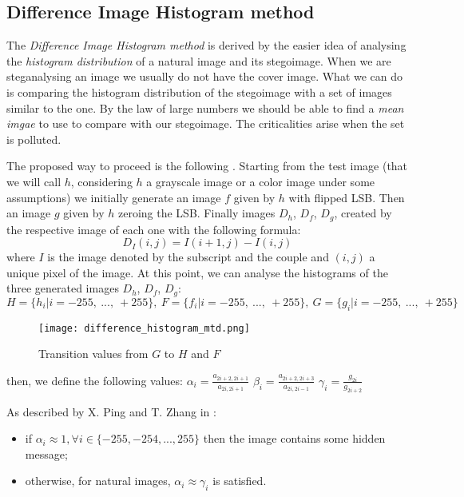 \documentclass[../../main.tex]{subfiles}
\begin{document}
\subsection{Difference Image Histogram method}
The \emph{Difference Image Histogram method} is derived by the easier idea
of analysing the \emph{histogram distribution} of a natural image and its
stegoimage. When we are steganalysing an image we usually do not
have the cover image. What we can do is comparing the histogram
distribution of the stegoimage with a set of images similar to the one. 
By the law of large numbers we should be able to find a \emph{mean imgae} to use to compare with our stegoimage.
The criticalities arise when the set is polluted.
\cite{methodology-steganalysis-images}

The proposed way to proceed is the following
\cite{new-detection-lsb-steganography}. 
Starting from the test image (that we will call $h$, considering $h$ a grayscale image or a color image under
some assumptions) we initially generate an image $f$ given by $h$ with flipped LSB. 
Then an image $g$ given by $h$ zeroing the LSB. Finally images $D_h$, $D_f$, $D_g$, 
created by the respective image of each one with the following formula:
          \[ D_{I}(i,j) = I(i+1,j) - I(i,j) \]
where $I$ is the image denoted by the subscript and the couple and
$(i,j)$ a unique pixel of the image.
At this point, we can analyse the histograms of the three generated images
$D_h$, $D_f$, $D_g$:
\[
    H = \{h_i | i = -255,\ ...,\ +255\},\ 
    F = \{f_i | i = -255,\ ...,\ +255\},\ 
    G = \{g_i | i = -255,\ ...,\ +255\}
\]

\begin{figure}[h]
    \centering
    \caption{Transition values from $G$ to $H$ and $F$}
    \texttt{[image: difference\_histogram\_mtd.png]}
\end{figure}

then, we define the following values: $\alpha_i = \frac{a_{2i+2,2i+1}}{a_{2i,2i+1}}$ $ \beta_i = \frac{a_{2i+2,2i+3}}{a_{2i,2i-1}}$ $\gamma_i = \frac{g_{2i}}{g_{2i+2}}$


As described by X. Ping and T. Zhang in
\cite{new-detection-lsb-steganography}:
\begin{itemize}[noitemsep]
    \item if $\alpha_i \approx 1, \forall i \in \{-255, -254, ..., 255\}$
          then the image contains some hidden message;
    \item otherwise, for natural images, $\alpha_i \approx \gamma_i$ is
          satisfied.
\end{itemize}
\end{document}

